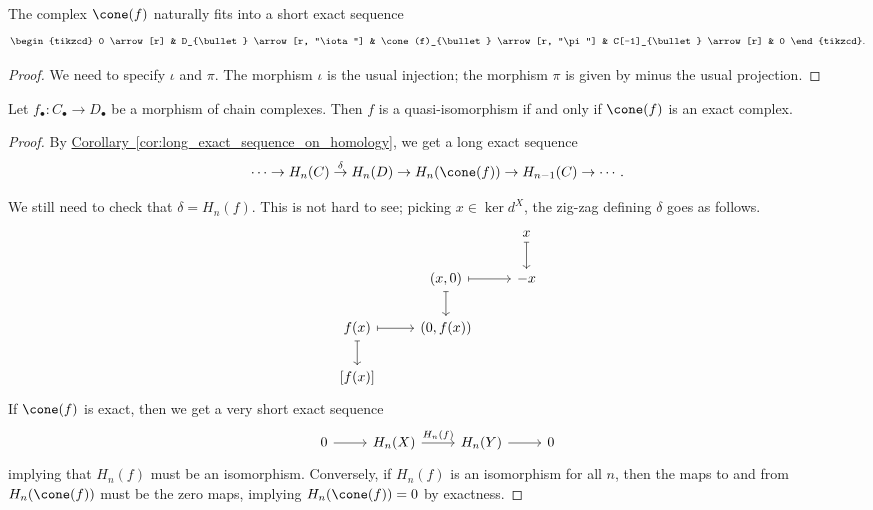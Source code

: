 \documentclass[main.tex]{subfiles}
\begin{document}
\begin{lemma}
  \label{lemma:cone_fits_into_ses}
  The complex $\cone(f)$ naturally fits into a short exact sequence
  \begin{equation*}
    \begin{tikzcd}
      0
      \arrow[r]
      & D_{\bullet}
      \arrow[r, "\iota"]
      & \cone(f)_{\bullet}
      \arrow[r, "\pi"]
      & C[-1]_{\bullet}
      \arrow[r]
      & 0
    \end{tikzcd}.
  \end{equation*}
\end{lemma}
\begin{proof}
  We need to specify $\iota$ and $\pi$. The morphism $\iota$ is the usual injection; the morphism $\pi$ is given by minus the usual projection.
\end{proof}

\begin{corollary}
  \label{cor:cone_controls_quasi_isomorphism}
  Let $f_{\bullet}\colon C_{\bullet} \to D_{\bullet}$ be a morphism of chain complexes. Then $f$ is a quasi-isomorphism if and only if $\cone(f)$ is an exact complex.
\end{corollary}
\begin{proof}
  By \hyperref[cor:long_exact_sequence_on_homology]{Corollary~\ref*{cor:long_exact_sequence_on_homology}}, we get a long exact sequence
  \begin{equation*}
    \cdots \to  H_{n}(C) \overset{\delta}{\to} H_{n}(D) \to H_{n}(\cone(f)) \to H_{n-1}(C) \to \cdots.
  \end{equation*}

  We still need to check that $\delta = H_{n}(f)$. This is not hard to see; picking $x \in \ker d^{X}$, the zig-zag defining $\delta$ goes as follows.
  \begin{equation*}
    \begin{tikzcd}
      && x
      \arrow[d, mapsto]
      \\
      & (x, 0)
      \arrow[r, mapsto]
      \arrow[d, mapsto]
      & -x
      \\
      f(x)
      \arrow[r, mapsto]
      \arrow[d, mapsto]
      & (0, f(x))
      \\
      {[f(x)]}
    \end{tikzcd}
  \end{equation*}
  If $\cone(f)$ is exact, then we get a very short exact sequence
  \begin{equation*}
    \begin{tikzcd}
      0
      \arrow[r]
      & H_{n}(X)
      \arrow[r, "H_{n}(f)"]
      & H_{n}(Y)
      \arrow[r]
      & 0
    \end{tikzcd}
  \end{equation*}
  implying that $H_{n}(f)$ must be an isomorphism. Conversely, if $H_{n}(f)$ is an isomorphism for all $n$, then the maps to and from $H_{n}(\cone(f))$ must be the zero maps, implying $H_{n}(\cone(f)) = 0$ by exactness.
\end{proof}
\end{document}
